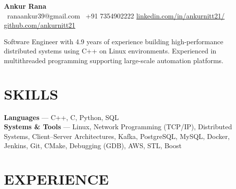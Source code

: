 \documentclass[11.9pt,a4paper]{article}
\begin{document}
\begin{center}
  {\Large \textbf{Ankur Rana}}\\[7pt]
  {\small
    \Letter\ ranaankur39@gmail.com \enspace\textbar\enspace
    \phone\ +91 7354902222 \enspace\textbar\enspace
    \href{https://www.linkedin.com/in/ankurnitt21/}{linkedin.com/in/ankurnitt21/} \enspace\textbar\enspace
    \href{https://github.com/ankurnitt21}{github.com/ankurnitt21}
  }
\end{center}

\vspace{8pt}

Software Engineer with 4.9 years of experience building high-performance distributed systems using C++ on Linux environments. Experienced in multithreaded programming supporting large-scale automation platforms.

\vspace{8pt}

\section*{SKILLS}

\noindent
\textbf{Languages} --- C++, C, Python, SQL\\[3pt]
\textbf{Systems \& Tools} --- Linux, Network Programming (TCP/IP), Distributed Systems, Client--Server Architectures, Kafka, PostgreSQL, MySQL, Docker, Jenkins, Git, CMake, Debugging (GDB), AWS, STL, Boost

\vspace{6pt}

\section*{EXPERIENCE}
\end{document}
